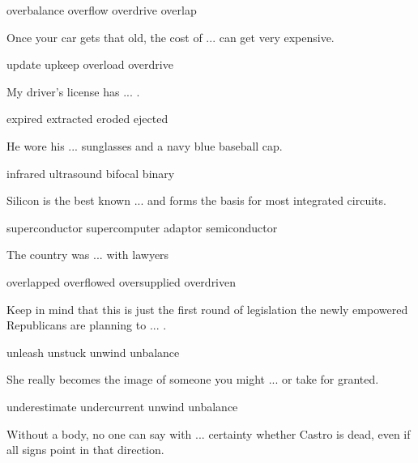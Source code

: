 \documentclass{exam}
\begin{document}
\begin{questions}
\begin{oneparchoices}
\choice overbalance
 \choice overflow
 \choice overdrive
 \correctchoice overlap
\end{oneparchoices}
\question Once your car gets that old, the cost of ... can get very expensive.\\
\begin{oneparchoices}
\choice update 
\correctchoice upkeep
 \choice overload
 \choice overdrive 
\end{oneparchoices}
\question My driver's license has ... .\\
\begin{oneparchoices} 
\correctchoice expired
 \choice extracted 
 \choice eroded
 \choice ejected
\end{oneparchoices}
\question He wore his ... sunglasses and a navy blue baseball cap.\\
\begin{oneparchoices} 
\choice infrared
 \choice ultrasound
\correctchoice bifocal
 \choice binary 
\end{oneparchoices}
\question Silicon is the best known ... and forms the basis for most integrated circuits.\\
\begin{oneparchoices} 
\choice superconductor
\choice supercomputer
\choice adaptor
\correctchoice semiconductor
\end{oneparchoices}
\question The country was ... with lawyers\\
\begin{oneparchoices} 
\choice overlapped
\choice overflowed
\correctchoice oversupplied 
\choice overdriven
\end{oneparchoices}
\question Keep in mind that this is just the first round of legislation the newly empowered Republicans are planning to ... .\\
\begin{oneparchoices} 
\correctchoice unleash
\choice unstuck
\choice unwind
\choice unbalance 
\end{oneparchoices}
\question She really becomes the image of someone you might ... or take for granted.\\
\begin{oneparchoices} 
\correctchoice underestimate
\choice undercurrent
\choice unwind
\choice unbalance
\end{oneparchoices}
\question Without a body, no one can say with ... certainty whether Castro is dead, even if all signs point in that direction.\\

\end{questions}
\end{document}
